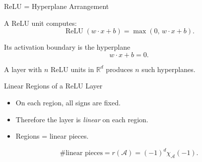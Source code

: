 \documentclass{beamer}
\begin{document}
\begin{frame}{ReLU = Hyperplane Arrangement}

A ReLU unit computes:
\[
\operatorname{ReLU}(w \cdot x + b) = \max(0,\, w \cdot x + b).
\]

Its activation boundary is the hyperplane
\[
w \cdot x + b = 0.
\]

A layer with $n$ ReLU units in $\mathbb R^d$ produces $n$ such hyperplanes.

\begin{center}
\end{center}

\end{frame}

\begin{frame}{Linear Regions of a ReLU Layer}
\begin{itemize}
  \item On each region, all signs are fixed.
  \item Therefore the layer is \emph{linear} on each region.
  \item Regions = linear pieces.
\end{itemize}

\[
\#\text{linear pieces} = r(\mathcal{A}) = (-1)^d \chi_{\mathcal{A}}(-1).
\]
\end{frame}
\end{document}
